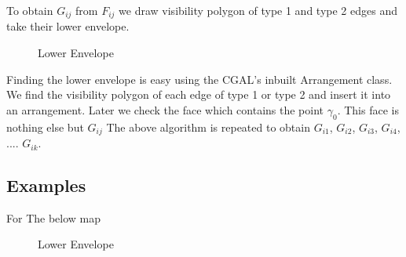 To obtain $G_{ij}$ from $F_{ij}$ we draw visibility polygon of type 1 and type 2 edges and take their lower envelope.

\begin{figure}[h]
\begin{center}
\caption{\label{fig:Construction}Lower Envelope}
\end{center}
\end{figure}

Finding the lower envelope is easy using the CGAL's inbuilt Arrangement class. We find the visibility polygon of each edge of type 1
or type 2 and insert it into an arrangement. Later we check the face which contains the point $\gamma_{0}$. This face is nothing else
but $G_{ij}$
The above algorithm is repeated to obtain $G_{i1}$, $G_{i2}$, $G_{i3}$, $G_{i4}$, .... $G_{ik}$.
\subsection{Examples}

For The below map
\begin{figure}
\begin{center}
\caption{\label{fig:Construction}Lower Envelope}
\end{center}
\end{figure}

